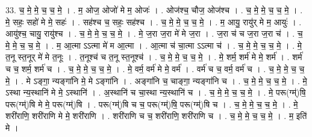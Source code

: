 \documentclass[17pt]{extarticle}
\begin{document}
33. च॒ मे॒ मे॒ च॒ च॒ मे॒ । . म॒ ओज॒ ओजो॑ मे म॒ ओजः॑ । . ओज॑श्च॒ चौज॒ ओज॑श्च । . च॒ मे॒ मे॒ च॒ च॒ मे॒ । . मे॒ सहः॒ सहो॑ मे मे॒ सहः॑ । . सह॑श्च च॒ सहः॒ सह॑श्च । . च॒ मे॒ मे॒ च॒ च॒ मे॒ । . म॒ आयु॒ रायु॑र् मे म॒ आयुः॑ । . आयु॑श्च॒ चायु॒ रायु॑श्च । . च॒ मे॒ मे॒ च॒ च॒ मे॒ । . मे॒ ज॒रा ज॒रा मे॑ मे ज॒रा । . ज॒रा च॑ च ज॒रा ज॒रा च॑ । . च॒ मे॒ मे॒ च॒ च॒ मे॒ । . म॒ आ॒त्मा ऽऽत्मा मे॑ म आ॒त्मा । . आ॒त्मा च॑ चा॒त्मा ऽऽत्मा च॑ । . च॒ मे॒ मे॒ च॒ च॒ मे॒ । . मे॒ त॒नू स्त॒नूर् मे॑ मे त॒नूः । . त॒नूश्च॑ च त॒नू स्त॒नूश्च॑ । . च॒ मे॒ मे॒ च॒ च॒ मे॒ । . मे॒ शर्म॒ शर्म॑ मे मे॒ शर्म॑ । . शर्म॑ च च॒ शर्म॒ शर्म॑ च । . च॒ मे॒ मे॒ च॒ च॒ मे॒ । . मे॒ वर्म॒ वर्म॑ मे मे॒ वर्म॑ । . वर्म॑ च च॒ वर्म॒ वर्म॑ च । . च॒ मे॒ मे॒ च॒ च॒ मे॒ । . मे ऽङ्गा॒ न्यङ्गा॑नि मे॒ मे ऽङ्गा॑नि । . अङ्गा॑नि च॒ चाङ्गा॒ न्यङ्गा॑नि च । . च॒ मे॒ मे॒ च॒ च॒ मे॒ । . मे॒ ऽस्था न्य॒स्थानि॑ मे मे॒ ऽस्थानि॑ । . अ॒स्थानि॑ च चा॒स्था न्य॒स्थानि॑ च । . च॒ मे॒ मे॒ च॒ च॒ मे॒ । . मे॒ परू(ग्म्॑)षि॒ परू(ग्म्॑)षि मे मे॒ परू(ग्म्॑)षि । . परू(ग्म्॑)षि च च॒ परू(ग्म्॑)षि॒ परू(ग्म्॑)षि च । . च॒ मे॒ मे॒ च॒ च॒ मे॒ । . मे॒ शरी॑राणि॒ शरी॑राणि मे मे॒ शरी॑राणि । . शरी॑राणि च च॒ शरी॑राणि॒ शरी॑राणि च । . च॒ मे॒ मे॒ च॒ च॒ मे॒ । . म॒ इति॑ मे । \newline
\end{document}

